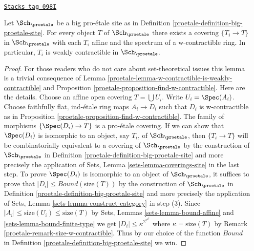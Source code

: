 \begin{lemma}
\label{proetale-lemma-get-many-weakly-contractible}
\href{https://stacks.math.columbia.edu/tag/098I}{\texttt{Stacks tag 098I}}

Let $\Sch_\proetale$ be a big pro-\'etale site as in
Definition \ref{proetale-definition-big-proetale-site}.
For every object $T$ of $\Sch_\proetale$ there exists
a covering $\{T_i \to T\}$ in $\Sch_\proetale$
with each $T_i$ affine and the spectrum of a w-contractible
ring. In particular, $T_i$ is weakly contractible in $\Sch_\proetale$.
\end{lemma}

\begin{proof}

For those readers who do not care about set-theoretical issues
this lemma is a trivial consequence of
Lemma \ref{proetale-lemma-w-contractible-is-weakly-contractible} and
Proposition \ref{proetale-proposition-find-w-contractible}.
Here are the details.
Choose an affine open covering $T = \bigcup U_i$. Write $U_i = \Spec(A_i)$.
Choose faithfully flat, ind-\'etale ring maps $A_i \to D_i$
such that $D_i$ is w-contractible as in
Proposition \ref{proetale-proposition-find-w-contractible}.
The family of morphisms $\{\Spec(D_i) \to T\}$ is a
pro-\'etale covering.
If we can show that $\Spec(D_i)$ is isomorphic to an object, say $T_i$,
of $\Sch_\proetale$, then $\{T_i \to T\}$ will be combinatorially
equivalent to a covering of $\Sch_\proetale$ by the construction
of $\Sch_\proetale$ in Definition \ref{proetale-definition-big-proetale-site}
and more precisely the application of
Sets, Lemma \ref{sets-lemma-coverings-site} in the last step.
To prove $\Spec(D_i)$ is isomorphic to an object of
$\Sch_\proetale$, it suffices to prove that
$|D_i| \leq Bound(\text{size}(T))$ by the construction
of $\Sch_\proetale$ in Definition \ref{proetale-definition-big-proetale-site}
and more precisely the application of
Sets, Lemma \ref{sets-lemma-construct-category} in step (3).
Since $|A_i| \leq \text{size}(U_i) \leq \text{size}(T)$
by Sets, Lemmas \ref{sets-lemma-bound-affine} and
\ref{sets-lemma-bound-finite-type} we get
$|D_i| \leq \kappa^{2^{2^{2^\kappa}}}$ where $\kappa = \text{size}(T)$
by Remark \ref{proetale-remark-size-w-contractible}.
Thus by our choice of the function $Bound$ in
Definition \ref{proetale-definition-big-proetale-site} we win.
\end{proof}

